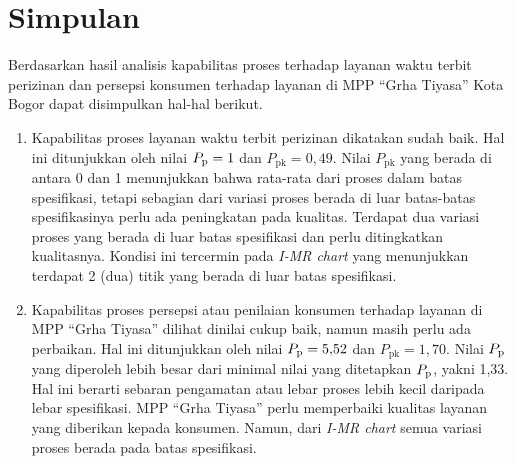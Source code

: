 \section{Simpulan}


Berdasarkan hasil analisis kapabilitas proses terhadap layanan waktu terbit perizinan dan persepsi konsumen terhadap layanan di MPP ``Grha Tiyasa'' Kota Bogor dapat disimpulkan hal-hal berikut.

\begin{enumerate}[align=left, label=\alph*., labelsep=0pt, labelwidth=\parindent]
    \item Kapabilitas proses layanan waktu terbit perizinan dikatakan sudah baik. Hal ini ditunjukkan oleh nilai $P_{\mathrm{p}} = 1$ dan $P_{\mathrm{pk}} = 0{,}49$. Nilai $P_{\mathrm{pk}}$ yang berada di antara 0 dan 1 menunjukkan bahwa rata-rata dari proses dalam batas spesifikasi, tetapi sebagian dari variasi proses berada di luar batas-batas spesifikasinya perlu ada peningkatan pada kualitas. Terdapat dua variasi proses yang berada di luar batas spesifikasi dan perlu ditingkatkan kualitasnya. Kondisi ini tercermin pada \textit{I-MR chart} yang menunjukkan terdapat 2 (dua) titik yang berada di luar batas spesifikasi.
    
    \item Kapabilitas proses persepsi atau penilaian konsumen terhadap layanan di MPP ``Grha Tiyasa'' dilihat dinilai cukup baik, namun masih perlu ada perbaikan. Hal ini ditunjukkan oleh nilai $P_{\mathrm{p}} = 5{,}52$ dan $P_{\mathrm{pk}} = 1{,}70$. Nilai $P_{\mathrm{p}}$ yang diperoleh lebih besar dari minimal nilai yang ditetapkan $P_{\mathrm{p}}$, yakni 1,33. Hal ini berarti sebaran pengamatan atau lebar proses lebih kecil daripada lebar spesifikasi. MPP ``Grha Tiyasa'' perlu memperbaiki kualitas layanan yang diberikan kepada konsumen. Namun, dari \textit{I-MR chart} semua variasi proses berada pada batas spesifikasi.
\end{enumerate}